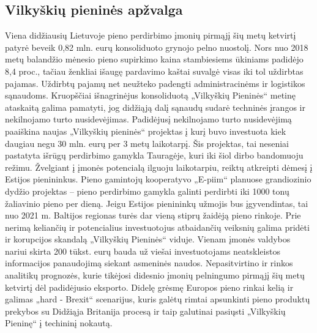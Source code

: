 \documentclass[12pt]{article}
\begin{document}
\subsection{Vilkyškių pieninės apžvalga}
Viena didžiausių Lietuvoje pieno perdirbimo įmonių pirmąjį šių metų ketvirtį patyrė beveik 0,82 mln. eurų konsoliduoto grynojo pelno nuostolį. Nors nuo 2018 metų balandžio mėnesio pieno supirkimo kaina stambiesiems ūkiniams padidėjo 8,4 proc., tačiau ženkliai išaugę pardavimo kaštai suvalgė visas iki tol uždirbtas pajamas. Uždirbtų pajamų net neužteko padengti administracinėms ir logistikos sąnaudoms. Kruopščiai išnagrinėjus konsoliduotą „Vilkyškių Pieninės“ metinę ataskaitą galima pamatyti, jog didžiąją dalį sąnaudų sudarė techninės įrangos ir nekilnojamo turto nusidevėjimas. Padidėjusį nekilnojamo turto nusidevėjimą paaiškina naujas „Vilkyškių pieninės“ projektas į kurį buvo investuota kiek daugiau negu 30 mln. eurų per 3 metų laikotarpį. Šis projektas, tai neseniai pastatyta išrūgų perdirbimo gamykla Tauragėje, kuri iki šiol dirbo bandomuoju režimu. Žvelgiant į įmonės potencialą ilguoju laikotarpiu, reiktų atkreipti dėmesį į Estijos pienininkus. Pieno gamintojų kooperatyvo „E-piim“ planuose grandiozinio dydžio projektas – pieno perdirbimo gamykla galinti perdirbti iki 1000 tonų žaliavinio pieno per dieną. Jeigu Estijos pienininkų užmojis bus įgyvendintas, tai nuo 2021 m. Baltijos regionas turės dar vieną stiprų žaidėją pieno rinkoje. Prie nerimą keliančių ir potencialius investuotojus atbaidančių veiksnių galima pridėti ir korupcijos skandalą „Vilkyškių Pieninės“ viduje. Vienam įmonės valdybos nariui skirta 200 tūkst. eurų bauda už viešai investuotojams neatskleistos informacijos panaudojimą siekant asmeninės naudos. Nepasitvirtino ir rinkos analitikų prognozės, kurie tikėjosi didesnio įmonių pelningumo pirmąjį šių metų ketvirtį dėl padidėjusio eksporto. Didelę grėsmę Europos pieno rinkai kelią ir galimas „hard - Brexit“ scenarijus, kuris galėtų rimtai apsunkinti pieno produktų prekybos su Didžiąja Britanija procesą ir taip galutinai pasiųsti „Vilkyškių Pieninę“ į techininį nokautą.
\end{document}
